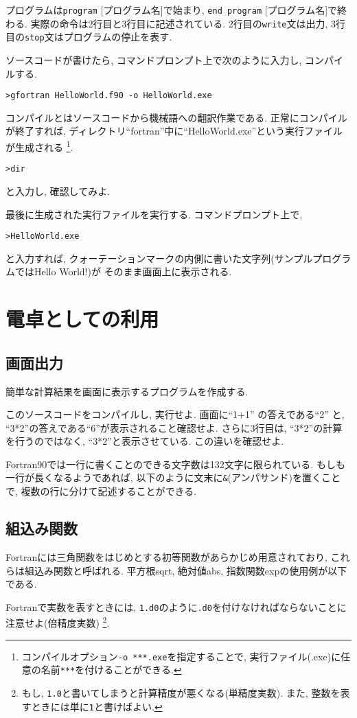 プログラムは\verb|program| [プログラム名]で始まり, \verb|end program| [プログラム名]で終わる.
実際の命令は2行目と3行目に記述されている.
2行目の\verb|write|文は出力, 3行目の\verb|stop|文はプログラムの停止を表す.


ソースコードが書けたら, コマンドプロンプト上で次のように入力し, コンパイルする.
\begin{Verbatim}[frame=single]
>gfortran HelloWorld.f90 -o HelloWorld.exe
\end{Verbatim}
コンパイルとはソースコードから機械語への翻訳作業である.
正常にコンパイルが終了すれば, ディレクトリ``fortran''中に``HelloWorld.exe''という実行ファイルが生成される
\footnote{コンパイルオプション\verb|-o ***.exe|を指定することで, 実行ファイル(.exe)に任意の名前\verb|***|を付けることができる. }.
\begin{Verbatim}[frame=single]
>dir
\end{Verbatim}
と入力し, 確認してみよ.

最後に生成された実行ファイルを実行する. コマンドプロンプト上で,
\begin{Verbatim}[frame=single]
>HelloWorld.exe
\end{Verbatim}
と入力すれば, クォーテーションマークの内側に書いた文字列(サンプルプログラムではHello World!)が
そのまま画面上に表示される.

\section{電卓としての利用}
\subsection*{画面出力}
簡単な計算結果を画面に表示するプログラムを作成する.

このソースコードをコンパイルし, 実行せよ.
画面に``1+1'' の答えである``2'' と, ``3*2''の答えである``6''が表示されること確認せよ.
さらに3行目は, ``3*2''の計算を行うのではなく, ``3*2''と表示させている. この違いを確認せよ.

Fortran90では一行に書くことのできる文字数は132文字に限られている.
もしも一行が長くなるようであれば, 以下のように文末に\verb|&|(アンパサンド)を置くことで,
複数の行に分けて記述することができる.



\subsection*{組込み関数}
Fortranには三角関数をはじめとする初等関数があらかじめ用意されており,
これらは組込み関数と呼ばれる.
平方根{\ttfamily sqrt}, 絶対値{\ttfamily abs}, 指数関数{\ttfamily exp}の使用例が以下である.

Fortranで実数を表すときには, \verb|1.d0|のように\verb|.d0|を付けなければならないことに注意せよ(倍精度実数)
\footnote{もし, \verb|1.0|と書いてしまうと計算精度が悪くなる(単精度実数).
また, 整数を表すときには単に\verb|1|と書けばよい. }.

